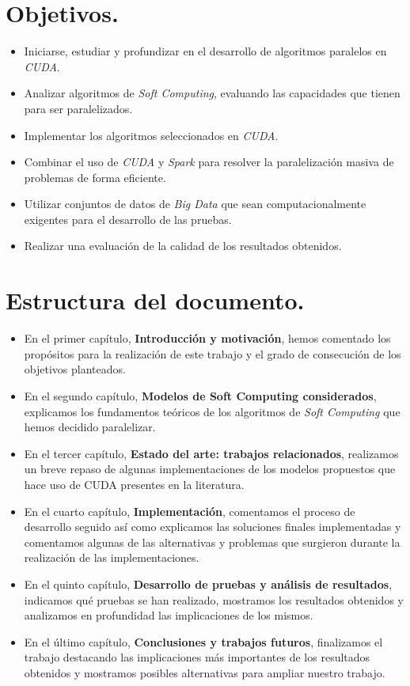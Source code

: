 \documentclass[a4paper,oneside,11pt,titlepage]{book}
\begin{document}
\section{Objetivos.}
\begin{itemize}
    \item Iniciarse, estudiar y profundizar en el desarrollo de algoritmos paralelos en \textit{CUDA}.
    \item Analizar algoritmos de \textit{Soft Computing}, evaluando las capacidades que tienen para ser paralelizados.
    \item Implementar los algoritmos seleccionados en \textit{CUDA}.
    \item Combinar el uso de \textit{CUDA} y \textit{Spark} para resolver la paralelización masiva de problemas de forma eficiente.
    \item Utilizar conjuntos de datos de \textit{Big Data} que sean computacionalmente exigentes para el desarrollo de las pruebas.
    \item Realizar una evaluación de la calidad de los resultados obtenidos.
\end{itemize}

\section{Estructura del documento.}

\begin{itemize}
    \item En el primer capítulo, \textbf{Introducción y motivación}, hemos comentado los propósitos para la realización de este trabajo y el grado de consecución de los objetivos planteados.
    \item En el segundo capítulo, \textbf{Modelos de Soft Computing considerados}, explicamos los fundamentos teóricos de los algoritmos de \textit{Soft Computing} que hemos decidido paralelizar.
    \item En el tercer capítulo, \textbf{Estado del arte: trabajos relacionados}, realizamos un breve repaso de algunas implementaciones de los modelos propuestos que hace uso de CUDA presentes en la literatura.
    \item En el cuarto capítulo, \textbf{Implementación}, comentamos el proceso de desarrollo seguido así como explicamos las soluciones finales implementadas y comentamos algunas de las alternativas y problemas que surgieron durante la realización de las implementaciones.
    \item En el quinto capítulo, \textbf{Desarrollo de pruebas y análisis de resultados}, indicamos qué pruebas se han realizado, mostramos los resultados obtenidos y analizamos en profundidad las implicaciones de los mismos.
    \item En el último capítulo, \textbf{Conclusiones y trabajos futuros}, finalizamos el trabajo destacando las implicaciones más importantes de los resultados obtenidos y mostramos posibles alternativas para ampliar nuestro trabajo.
\end{itemize}
\end{document}
